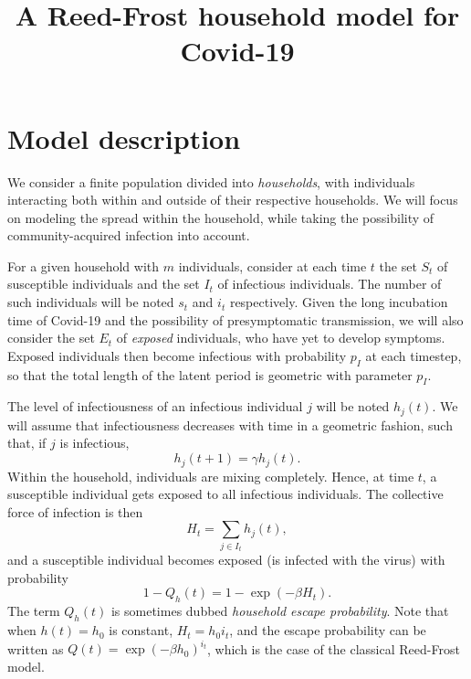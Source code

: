 \documentclass[a4paper]{article}
\title{A Reed-Frost household model for Covid-19}
\begin{document}
\maketitle

\section*{Model description}

We consider a finite population divided into \emph{households}, with individuals
interacting both within and outside of their respective households. We will 
focus on modeling the spread within the household, while taking the possibility
of community-acquired infection into account. 

For a given household with \(m\) individuals, consider at each time \(t\) the
set \(S_t\) of susceptible individuals and the set \(I_t\) of infectious
individuals. The number of such individuals will be noted \(s_t\) and \(i_t\)
respectively. Given the long incubation time of Covid-19 and the possibility of
presymptomatic transmission, we will also consider the set \(E_t\) of 
\emph{exposed} individuals, who have yet to develop symptoms. Exposed 
individuals then become infectious with probability \(p_I\) at each timestep, so
that the total length of the latent period is geometric with parameter \(p_I\).

The level of infectiousness of an infectious individual \(j\) will be noted 
\(h_j(t)\). We will assume that infectiousness decreases with time in a 
geometric fashion, such that, if \(j\) is infectious, 
\begin{equation}
	h_j(t+1) = \gamma h_j(t).
\end{equation}
Within the household, individuals are mixing completely. Hence, at time \(t\), a
susceptible individual gets exposed to all infectious individuals. The 
collective force of infection is then 
\begin{equation}
	H_t = \sum_{j\in I_t} h_j(t),
\end{equation}
and a susceptible individual becomes exposed (is infected with the virus) with
probability
\begin{equation}
	1-Q_h(t) = 1- \exp(-\beta H_t).
\end{equation}
The term \(Q_h(t)\) is sometimes dubbed \emph{household escape probability}. 
Note that when \(h(t)=h_0\) is constant, \(H_t=h_0 i_t\), and the escape
probability can be written as \(Q(t) = \exp(-\beta h_0)^{i_t}\), which is the
case of the classical Reed-Frost model.
\end{document}
